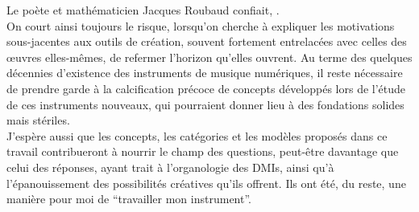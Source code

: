 







\noindent Le poète et mathématicien Jacques Roubaud confiait, .\\
\indent On court ainsi toujours le risque, lorsqu'on cherche à expliquer les motivations sous-jacentes aux outils de création, souvent fortement entrelacées avec celles des œuvres elles-mêmes, de refermer l'horizon qu'elles ouvrent. Au terme des quelques décennies d'existence des instruments de musique numériques, il reste nécessaire de  prendre garde à la calcification précoce de concepts développés lors de l'étude de ces instruments nouveaux, qui pourraient donner lieu à des fondations solides mais stériles.\\
\indent J'espère aussi que les concepts, les catégories et les modèles proposés dans ce travail contribueront à nourrir le champ des questions, peut-être davantage que celui des réponses, ayant trait à l'organologie des \glspl{DMI}, ainsi qu'à l'épanouissement des possibilités créatives qu'ils offrent. Ils ont été, du reste, une manière pour moi de ``travailler mon instrument''.




